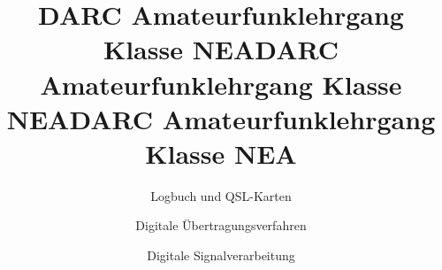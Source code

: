 \documentclass[aspectratio = 169]{beamer}
\begin{document}
\title{DARC Amateurfunklehrgang Klasse NEA}
\author{Logbuch und QSL-Karten}
\begin{frame}
\maketitle
\end{frame}



\title{DARC Amateurfunklehrgang Klasse NEA}
\author{Digitale Übertragungsverfahren}
\begin{frame}
\maketitle
\end{frame}





























\title{DARC Amateurfunklehrgang Klasse NEA}
\author{Digitale Signalverarbeitung}
\begin{frame}
\maketitle
\end{frame}














\end{document}
